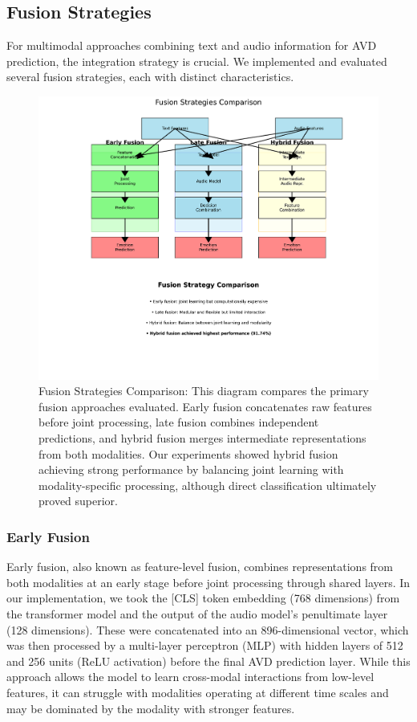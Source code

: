 \documentclass[12pt]{article}
\begin{document}
\subsection{Fusion Strategies}
\label{subsec:fusion}
For multimodal approaches combining text and audio information for AVD prediction, the integration strategy is crucial. We implemented and evaluated several fusion strategies, each with distinct characteristics.

\begin{figure}[h]
    \centering
    \includegraphics[width=0.9\linewidth]{Figures_Improved/fusion_strategies_comparison_improved.png}
    \caption{Fusion Strategies Comparison: This diagram compares the primary fusion approaches evaluated. Early fusion concatenates raw features before joint processing, late fusion combines independent predictions, and hybrid fusion merges intermediate representations from both modalities. Our experiments showed hybrid fusion achieving strong performance by balancing joint learning with modality-specific processing, although direct classification ultimately proved superior.}
    \label{fig:fusion_strategies}
\end{figure}

\subsubsection{Early Fusion}
Early fusion, also known as feature-level fusion, combines representations from both modalities at an early stage before joint processing through shared layers. In our implementation, we took the [CLS] token embedding (768 dimensions) from the transformer model and the output of the audio model's penultimate layer (128 dimensions). These were concatenated into an 896-dimensional vector, which was then processed by a multi-layer perceptron (MLP) with hidden layers of 512 and 256 units (ReLU activation) before the final AVD prediction layer. While this approach allows the model to learn cross-modal interactions from low-level features, it can struggle with modalities operating at different time scales and may be dominated by the modality with stronger features.
\end{document}
